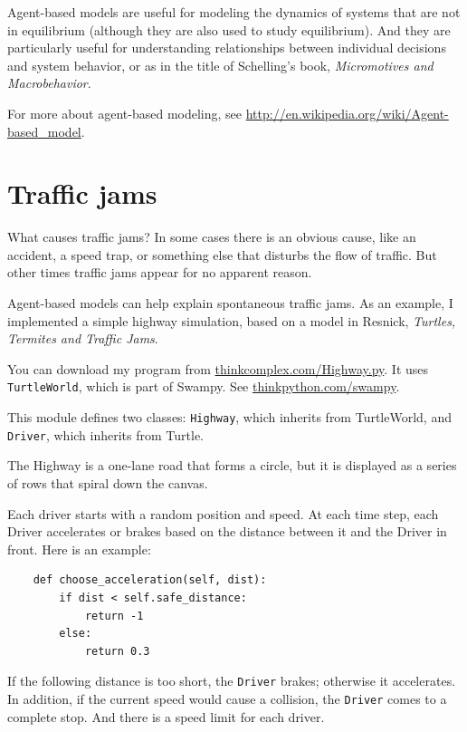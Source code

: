 \documentclass[10pt]{book}
\begin{document}
Agent-based models are useful for modeling the dynamics of systems
that are not in equilibrium (although they are also used to study
equilibrium).  And they are particularly useful for understanding
relationships between individual decisions and system behavior, or as
in the title of Schelling's book, {\em Micromotives and Macrobehavior}.

For more about agent-based modeling, see
\url{http://en.wikipedia.org/wiki/Agent-based_model}.


\section{Traffic jams}

What causes traffic jams?  In some cases there is an obvious cause,
like an accident, a speed trap, or something else that disturbs
the flow of traffic.  But other times traffic jams appear for no
apparent reason.

Agent-based models can help explain spontaneous traffic jams.
As an example, I implemented a simple highway simulation, based on
a model in Resnick, {\em Turtles, Termites and Traffic Jams}.

You can download my program from \url{thinkcomplex.com/Highway.py}.
It uses {\tt TurtleWorld}, which is part of Swampy.
See \url{thinkpython.com/swampy}.

This module defines two classes: {\tt Highway}, which inherits from
TurtleWorld, and {\tt Driver}, which inherits from Turtle.

The Highway is a one-lane road that forms a circle, but it is displayed
as a series of rows that spiral down the canvas.

Each driver starts with a random position and speed.  At each time
step, each Driver accelerates or brakes based on the distance between
it and the Driver in front.  Here is an example:

\begin{verbatim}
    def choose_acceleration(self, dist):
        if dist < self.safe_distance:
            return -1
        else:
            return 0.3
\end{verbatim}

If the following distance is too short, the {\tt Driver} brakes;
otherwise it accelerates.  In addition, if the current speed would
cause a collision, the {\tt Driver} comes to a complete stop.
And there is a speed limit for each driver.
\end{document}
